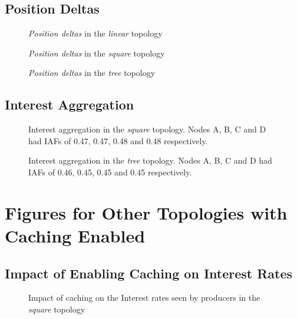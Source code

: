\begin{appendices}
\section{Position Deltas}
\begin{figure}[H]
    \centering
    \caption{\textit{Position deltas} in the \textit{linear} topology}
\end{figure}

\begin{figure}[H]
    \centering
    \caption{\textit{Position deltas} in the \textit{square} topology}
\end{figure}

\begin{figure}[H]
    \centering
    \caption{\textit{Position deltas} in the \textit{tree} topology}
\end{figure}

\section{Interest Aggregation}
\begin{figure}[H]
    \centering
    \caption{Interest aggregation in the \textit{square} topology. Nodes A, B, C and D had IAFs of 0.47, 0.47, 0.48 and 0.48 respectively.}
\end{figure}

\begin{figure}[H]
    \centering
    \caption{Interest aggregation in the \textit{tree} topology. Nodes A, B, C and D had IAFs of 0.46, 0.45, 0.45 and 0.45 respectively.}
\end{figure}

\chapter{Figures for Other Topologies with Caching Enabled}\label{app:eval:caching}
\section{Impact of Enabling Caching on Interest Rates}
\begin{figure}[H]
    \centering
    \caption{Impact of caching on the Interest rates seen by producers in the \textit{square} topology}
\end{figure}


\end{appendices}
